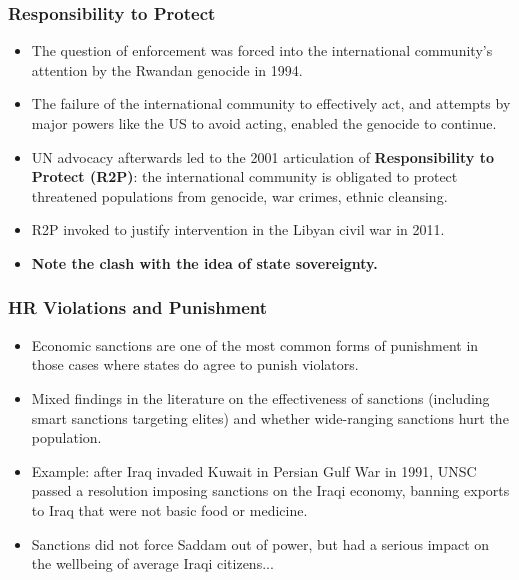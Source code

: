 \documentclass{beamer}
\begin{document}
\begin{frame} 
	\frametitle{\LARGE{Responsibility to Protect}}
	\begin{itemize}
		\item The question of enforcement was forced into the international community's attention by the Rwandan genocide in 1994. \pause
		\item The failure of the international community to effectively act, and attempts by major powers like the US to avoid acting, enabled the genocide to continue. \pause
		\item UN advocacy afterwards led to the 2001 articulation of \textbf{Responsibility to Protect (R2P)}: the international community is obligated to protect threatened populations from genocide, war crimes, ethnic cleansing. \pause
		\item R2P invoked to justify intervention in the Libyan civil war in 2011. \pause
		\item \textbf{Note the clash with the idea of state sovereignty.}
	\end{itemize}
\end{frame}

\begin{frame} 
	\frametitle{\LARGE{HR Violations and Punishment}}
	\begin{itemize}
		\item Economic sanctions are one of the most common forms of punishment in those cases where states do agree to punish violators. \pause
		\item Mixed findings in the literature on the effectiveness of sanctions (including smart sanctions targeting elites) and whether wide-ranging sanctions hurt the population. \pause
		\item Example:  after Iraq invaded Kuwait in Persian Gulf War in 1991, UNSC passed a resolution imposing sanctions on the Iraqi economy, banning exports to Iraq that were not basic food or medicine. \pause
		\item Sanctions did not force Saddam out of power, but had a serious impact on the wellbeing of average Iraqi citizens...		 
	\end{itemize}
\end{frame}

\end{document}
